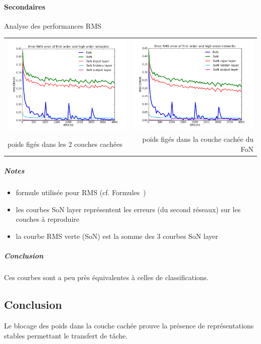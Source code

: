     \paragraph{Secondaires}
       Analyse des performances RMS
      \begin{center}
	\begin{tabular}{lr}
	  \hspace*{-1cm}
	  \includegraphics[width=250px]{data/expB4/rms_bb.png}
	  &
	  \includegraphics[width=250px]{data/expB4/rms_block.png} \\
	  poids figés dans les 2 couches cachées
	  &
	  poids figés dans la couche cachée du FoN
	\end{tabular}
      \end{center} 
      \subparagraph{Notes}
	\begin{itemize}
	  \item formule utilisée pour RMS (cf. Formules~)
	  \item les courbes SoN layer représentent les erreurs (du second réseaux) sur les couches à reproduire 
	  \item la courbe RMS verte (SoN) est la somme des 3 courbes SoN layer
	\end{itemize}
      \subparagraph{Conclusion}
	Ces courbes sont a peu près équivalentes à celles de classifications.

  \subsection{Conclusion}
    Le blocage des poids dans la couche cachée prouve la présence de représentations stables permettant le 
  transfert de tâche.
  
